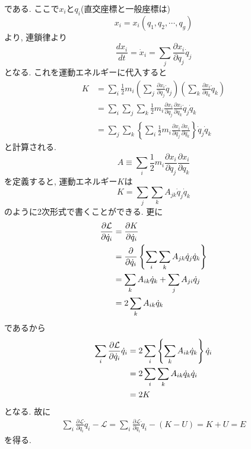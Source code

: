 である.
ここで$x_{i}$と$q_{i}$(直交座標と一般座標は)
\begin{equation}
 x_{i} = x_{i} (q_{1}, q_{2}, \cdots, q_{g})
\end{equation}
より, 連鎖律より
\begin{equation}
 \frac{d x_{i}}{d t}
=\dot{x}_{i}
=\sum_{j}\frac{\partial x_{i}}{\partial q_{j}} \dot{q}_{j}
\end{equation}
となる. これを運動エネルギーに代入すると
\begin{align}
  K
&=\sum_{i} \frac{1}{2} m_{i}
  \left(\sum_{j} \frac{\partial x_{i}}{\partial q_{j}} \dot{q}_{j} \right)
  \left(\sum_{k} \frac{\partial x_{i}}{\partial q_{k}} \dot{q}_{k} \right)
  \\
&=\sum_{i} \sum_{j} \sum_{k} \frac{1}{2} m_{i}
  \frac{\partial x_{i}}{\partial q_{j}}
  \frac{\partial x_{i}}{\partial q_{k}}
  \dot{q}_{j} \dot{q}_{k}
  \\
&=\sum_{j} \sum_{k}
  \left\{
          \sum_{i} \frac{1}{2} m_{i}
          \frac{\partial x_{i}}{\partial q_{j}}
          \frac{\partial x_{i}}{\partial q_{k}}
  \right\}
  \dot{q}_{j} \dot{q}_{k}
\end{align}
と計算される.
\begin{equation}
 A \equiv
 \sum_{i} \frac{1}{2} m_{i}
 \frac{\partial x_{i}}{\partial q_{j}}
 \frac{\partial x_{i}}{\partial q_{k}}
\end{equation}
を定義すると, 運動エネルギー$K$は
\begin{equation}
 K = \sum_{j} \sum_{k} A_{jk} \dot{q}_{j} \dot{q}_{k}
\end{equation}
のように2次形式で書くことができる.
更に
\begin{align}
  \frac{\partial \mathcal{L}}{\partial \dot{q}_{i}}
&=\frac{\partial K}{\partial \dot{q}_{i}}
  \notag
  \\
&=\frac{\partial}{\partial \dot{q}_{i}}
  \left\{
          \sum_{i} \sum_{k} A_{jk} \dot{q}_{j} \dot{q}_{k}
  \right\}
  \notag
  \\
&=\sum_{k} A_{ik} \dot{q}_{k} + \sum_{j} A_{ji} \dot{q}_{j}
  \notag
  \\
&=2\sum_{k} A_{ik} \dot{q}_{k}
\end{align}
であるから
\begin{align}
  \sum_{i} \frac{\partial \mathcal{L}}{\partial \dot{q}_{i}} \dot{q}_{i}
&=2\sum_{i} \left\{ \sum_{k} A_{ik} \dot{q}_{k} \right\} \dot{q}_{i}
  \notag
  \\
&=2\sum_{i}\sum_{k} A_{ik} \dot{q}_{k} \dot{q}_{i}
  \notag
  \\
&=2K
\end{align}
となる.
故に
\begin{align}
 \sum_{i} \frac{\partial \mathcal{L}}{\partial \dot{q}_{i}} \dot{q}_{i} - \mathcal{L}
=\sum_{i} \frac{\partial \mathcal{L}}{\partial \dot{q}_{i}} \dot{q}_{i} - (K-U)
=K+U=E
\end{align}
を得る.

